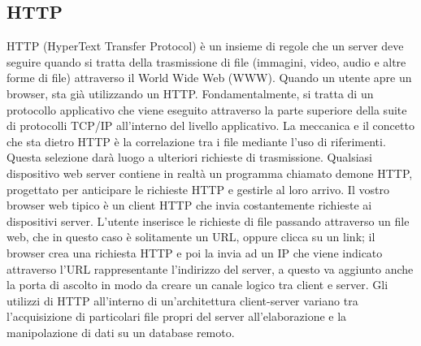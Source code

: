 \subsection{HTTP}
HTTP (HyperText Transfer Protocol) è un insieme di regole che un server deve seguire quando si tratta della trasmissione di file (immagini, video, audio e altre forme di file) attraverso il World Wide Web (WWW). Quando un utente apre un browser, sta già utilizzando un HTTP. Fondamentalmente, si tratta di un protocollo applicativo che viene eseguito attraverso la parte superiore della suite di protocolli TCP/IP all'interno del livello applicativo. 
La meccanica e il concetto che sta dietro HTTP è la correlazione tra i file mediante l'uso di riferimenti. Questa selezione darà luogo a ulteriori richieste di trasmissione. Qualsiasi dispositivo web server contiene in realtà un programma chiamato demone HTTP, progettato per anticipare le richieste HTTP e gestirle al loro arrivo. Il vostro browser web tipico è un client HTTP che invia costantemente richieste ai dispositivi server. L'utente inserisce le richieste di file passando attraverso un file web, che in questo caso è solitamente un URL, oppure clicca su un link; il browser crea una richiesta HTTP e poi la invia ad un IP che viene indicato attraverso l'URL rappresentante l'indirizzo del server, a questo va aggiunto anche la porta di ascolto in modo da creare un canale logico tra client e server. Gli utilizzi di HTTP all'interno di un'architettura client-server variano tra l'acquisizione di particolari file propri del server all'elaborazione e la manipolazione di dati su un database remoto. 

